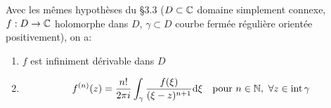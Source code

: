\begin{corollary}[10.2, p.73]
    Avec les mêmes hypothèses du §3.3 ($D \subset \mathbb{C}$ domaine simplement connexe, $f: D \rightarrow \mathbb{C}$ holomorphe dans $D$, $\gamma \subset D$ courbe fermée régulière orientée positivement), on a:
    
    \begin{enumerate}[label=\arabic{enumi})]
        \item 
        $f$ est infiniment dérivable dans $D$
        \item 
        \[
        f^{(n)}(z) = \frac{n!}{2\pi i} \int_\gamma \frac{f(\xi)}{(\xi - z)^{n+1}} \mathrm{d}\xi \quad \textrm{pour } n \in \mathbb{N}, \ \forall z \in \textrm{int}\, \gamma
        \]
    \end{enumerate}
\end{corollary}

\begin{comment}\hfill

    \begin{enumerate}[label=\arabic{enumi})]
        \item 
        Pour $n=0$, le corollaire redonne la formule intégrale de Cauchy:
        
        \[
        f(z) = f^{(0)}(z) = \frac{0!}{2\pi i} \int_\gamma \frac{f(\xi)}{\xi - z} \dxi
        \]
        
        \item 
        Résultat remarquable: le corollaire affirme qu'une fonction holomorphe dans $D$ (i.e. dérivable $\forall z \in D$) est en fait infiniment dérivable et que sa $n$-ième dérivée se calcule en dérivant $n$ fois par rapport à $z$ sous l'intégrale de la formule de Cauchy.
        En effet: $\quad ' = \frac{\dd}{\dz}$
        
        \[
        f^{(1)}(z) = \frac{1}{2\pi i} \int_\gamma f(\xi) \left[\frac{1}{\xi - z}\right]' \dxi
        = \frac{1}{2\pi i} \int_\gamma \frac{f(\xi)}{(\xi - z)^2} \dxi = \frac{1!}{2\pi i} \int_\gamma \frac{f(\xi)}{(\xi - z)^2} \dxi
        \]
        
        \[
        f^{(2)}(z) = \frac{1}{2\pi i} \int_\gamma f(\xi) \left[\frac{1}{(\xi - z)^2}\right]' \dxi
        = \frac{2}{2\pi i} \int_\gamma \frac{f(\xi)}{(\xi - z)^3} \dxi = \frac{2!}{2\pi i} \int_\gamma \frac{f(\xi)}{(\xi - z)^3} \dxi 
        \]
        
        \[
        f^{(3)}(z) = \frac{2}{2\pi i} \int_\gamma f(\xi) \left[\frac{1}{(\xi - z)^3}\right]' \dxi
        = \frac{2 \cd 3}{2\pi i} \int_\gamma \frac{f(\xi)}{(\xi - z)^4} \dxi = \frac{3!}{2\pi i} \int_\gamma \frac{f(\xi)}{(\xi - z)^4} \dxi 
        \]
        
        Récurrence sur $n$:
        
        \[
        f^{(n)}(z) = \frac{n!}{2\pi i} \int_\gamma \frac{f(\xi)}{(\xi - z)^{n+1}} \dxi
        \]
    \end{enumerate}
\end{comment}

